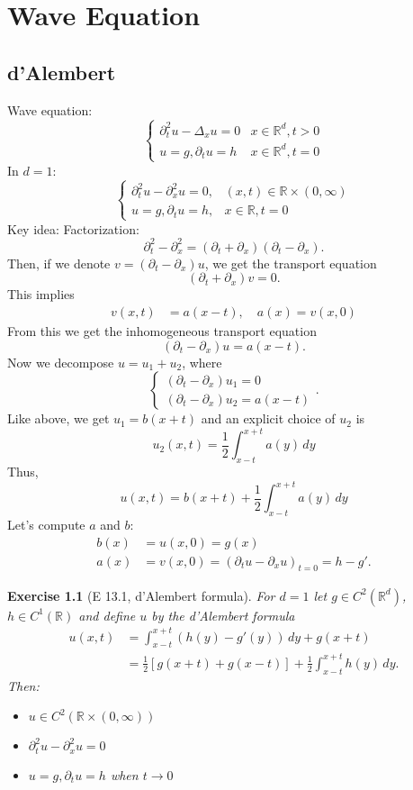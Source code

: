 \documentclass{report}
\theoremstyle{tommy}
\newtheorem{ex}[defn]{Exercise}
\begin{document}
	\chapter{Wave Equation}
	\section{d'Alembert}
	Wave equation:
	\[\begin{cases}
		\partial_t^2 u - \Delta_x u = 0 &x \in \mathbb{R}^d, t > 0 \\
		u = g, \partial_t u = h &x \in \mathbb{R}^d, t = 0
	\end{cases}\]
	In \(d=1\):
	\[\begin{cases}
		\partial_t^2 u - \partial_x^2 u = 0, & (x,t) \in \mathbb{R} \times (0,\infty) \\
		u = g, \partial_t u = h, & x \in \mathbb{R}, t = 0
	\end{cases}\]
	Key idea: Factorization:
	\[\partial_t^2 - \partial_x^2 = (\partial_t + \partial_x) (\partial_t - \partial_x).\]
	Then, if we denote \(v = (\partial_t - \partial_x) u\), we get the transport equation
		\[(\partial_t + \partial_x) v = 0.\]
	This implies 
	\begin{align*}
		v(x,t) &= a(x-t), \quad a(x) = v(x,0)
	\end{align*}
	From this we get the inhomogeneous transport equation
	\[(\partial_t - \partial_x) u = a(x-t).\]
	Now we decompose \(u = u_1 + u_2\), where 
	\[\begin{cases}
		(\partial_t - \partial_x) u_1 = 0 \\
		(\partial_t - \partial_x) u_2 = a (x-t)
	\end{cases}.\]
	Like above, we get \(u_1 = b(x+t)\) and an explicit choice of \(u_2\) is
	\[u_2(x,t) = \frac{1}{2} \int_{x-t}^{x+t} a(y) \, dy\]
	Thus,
	\[u(x,t) = b(x+t) + \frac{1}{2} \int_{x-t}^{x+t} a(y) \, dy\]
	Let's compute \(a\) and \(b\):\
	\begin{align*}
		b(x) &= u(x,0) = g(x) \\
		a(x) &= v(x,0) = (\partial_t u - \partial_x u)_{t = 0} = h-g'.
	\end{align*}
	
	\begin{ex}[E 13.1, d'Alembert formula]
		For \(d = 1\) let \(g \in C^2(\mathbb{R}^d)\), \(h \in C^1(\mathbb{R})\) and define \(u\) by the \emph{d'Alembert formula}
		\begin{align*}
			u(x,t) &= \int_{x-t}^{x+t} (h(y)-g'(y)) \, dy + g(x+t) \\
			&= \frac{1}{2} [g(x+t)+g(x-t)] + \frac{1}{2} \int_{x-t}^{x+t} h(y) \, dy.
		\end{align*}
		Then:
		\begin{itemize}
			\item \(u \in C^2(\mathbb{R} \times (0,\infty))\)
			\item \(\partial_t^2 u - \partial_x^2 u = 0\) 
			\item \(u = g, \partial_t u = h\) when \(t \to 0\)
		\end{itemize}
	\end{ex}
\end{document}
